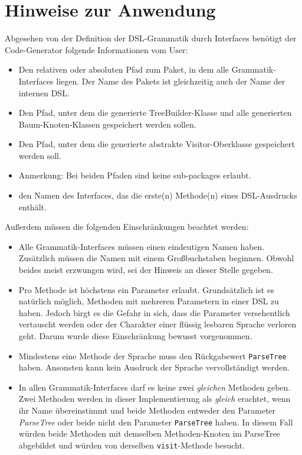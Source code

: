 \section{Hinweise zur Anwendung}\label{sct:6.1:hinweise}
Abgesehen von der Definition der DSL-Grammatik durch Interfaces benötigt der Code-Generator folgende Informationen vom User:

\begin{itemize}
	 \item Den relativen oder absoluten Pfad zum Paket, in dem alle Grammatik-Interfaces liegen. Der Name des Pakets ist gleichzeitig auch der Name der internen DSL.
	 \item Den Pfad, unter dem die generierte TreeBuilder-Klasse und alle generierten Baum-Knoten-Klassen gespeichert werden sollen.
	 \item Den Pfad, unter dem die generierte abstrakte Visitor-Oberklasse gespeichert werden soll.
	 \item Anmerkung: Bei beiden Pfaden sind keine sub-packages erlaubt.
	 \item den Namen des Interfaces, das die erste(n) Methode(n) eines DSL-Ausdrucks enthält.
\end{itemize}

\noindent
Außerdem müssen die folgenden Einschränkungen beachtet werden:

\begin{itemize}
	\item Alle Grammatik-Interfaces müssen einen eindeutigen Namen haben. Zusätzlich müssen die Namen mit einem Großbuchstaben beginnen. Obwohl beides meist erzwungen wird, sei der Hinweis an dieser Stelle gegeben.
	\item Pro Methode ist höchstens ein Parameter erlaubt. Grundsätzlich ist es natürlich möglich, Methoden mit mehreren Parametern in einer DSL zu haben. Jedoch birgt es die Gefahr in sich, dass die Parameter versehentlich vertauscht werden oder der Charakter einer flüssig lesbaren Sprache verloren geht. Darum wurde diese Einschränkung bewusst vorgenommen.
	\item Mindestens eine Methode der Sprache muss den Rückgabewert \texttt{ParseTree} haben. Ansonsten kann kein Ausdruck der Sprache vervollständigt werden.
	\item In allen Grammatik-Interfaces darf es keine zwei \emph{gleichen} Methoden geben. Zwei Methoden werden in dieser Implementierung als \emph{gleich} erachtet, wenn ihr Name übereinstimmt und beide Methoden entweder den Parameter \emph{ParseTree} oder beide nicht den Parameter \texttt{ParseTree} haben. In diesem Fall würden beide Methoden mit demselben Methoden-Knoten im ParseTree abgebildet und würden von derselben \texttt{visit}-Methode besucht.
\end{itemize}